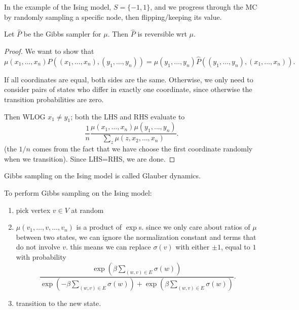 In the example of the Ising model, $S=\{-1,1\}$, and we progress through the MC by randomly sampling a specific node, then flipping/keeping its value. 

\begin{theorem}
\proplabel

Let $\hat{P}$ be the Gibbs sampler for $\mu$. Then $\hat{P}$ is reversible wrt $\mu$. 
\end{theorem}

\begin{proof}
We want to show that 
\[\mu(x_1,\hdots,x_n)\hat{P}((x_1,\hdots,x_n),(y_1,\hdots,y_n)) = \mu(y_1,\hdots,y_n)\hat{P}((y_1,\hdots,y_n),(x_1,\hdots,x_n)).\]

If all coordinates are equal, both sides are the same. Otherwise, we only need to consider pairs of states who differ in exactly one coordinate, since otherwise the transition probabilities are zero. 

Then WLOG $x_1\neq y_1$; both the LHS and RHS evaluate to
\[\frac{1}{n}\frac{\mu(x_1,\hdots,x_n)\mu(y_1,\hdots,y_n)}{\sum_z\mu(z,x_2,\hdots,x_n)}.\]
(the $1/n$ comes from the fact that we have choose the first coordinate randomly when we transition). Since LHS=RHS, we are done.
\end{proof}

\begin{example}
\exlabel

Gibbs sampling on the Ising model is called \ac{Glauber dynamics}. 
\end{example}

To perform Gibbs sampling on the Ising model: 
\begin{enumerate}
    \item pick vertex $v\in V$ at random
    \item $\mu(v_1,\hdots,v,\hdots,v_n)$ is a product of $\exp$s. since we only care about ratios of $\mu$ between two states, we can ignore the normalization constant and terms that do not involve $v$. this means we can replace $\sigma(v)$ with either $\pm 1$, equal to $1$ with probability 
    \[\frac{\exp(\beta \sum_{(w,v)\in E} \sigma(w))}{\exp(-\beta \sum_{(w,v)\in E}\sigma(w)) + \exp(\beta \sum_{(w,v)\in E}\sigma(w))}.\]
    \item transition to the new state. 
\end{enumerate}